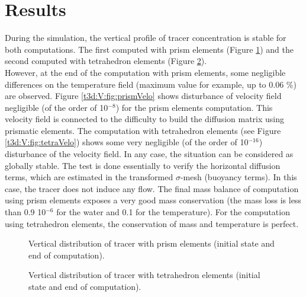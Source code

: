 \section{Results}
\bigskip
During the simulation, the vertical profile of tracer concentration is stable 
for both computations. The first computed with prism elements (Figure \ref{t3d:V:fig:prismTr})
 and the second computed with tetrahedron elements (Figure \ref{t3d:V:fig:tetraTr}).\\
However, at the end of the computation with prism elements, some negligible differences 
on the temperature field (maximum value for example, up to 0.06 \%) are observed. %
Figure \ref{t3d:V:fig:prismVelo} shows disturbance of velocity field negligible 
(of the order of 10$^{-8}$) for the prism elements computation. This velocity field is connected 
to the difficulty to build the diffusion matrix using prismatic elements. %
The computation with tetrahedron elements (see Figure \ref{t3d:V:fig:tetraVelo}) shows 
some very negligible (of the order of 10$^{-16}$) disturbance of the velocity field. %
In any case, the situation can be considered as globally stable. The test is done essentially 
to verify the horizontal diffusion terms, which are estimated in the transformed $\sigma$-mesh 
(buoyancy terms). In this case, the tracer does not induce any flow. 
The final mass balance of computation using prism elements exposes a very good mass conservation 
(the mass loss is less than 0.9 10$^{-6}$ for the water and 0.1 for the temperature). %
For the computation using tetrahedron elements, the conservation of mass and temperature is perfect.

\begin{figure}[!htbp]
\begin{minipage}[t]{0.50\textwidth}
 \centering
{}
\end{minipage}%
\begin{minipage}[t]{0.50\textwidth}
 \centering
{}
\end{minipage}
 \caption{Vertical distribution of tracer with prism elements (initial state and end of computation).}
 \label{t3d:V:fig:prismTr}
\end{figure}

\begin{figure}[!htbp]
\begin{minipage}[t]{0.50\textwidth}
 \centering
{}
\end{minipage}%
\begin{minipage}[t]{0.50\textwidth}
 \centering
{}
\end{minipage}
 \caption{Vertical distribution of tracer with tetrahedron elements (initial state and end of computation).}
 \label{t3d:V:fig:tetraTr}
\end{figure}


